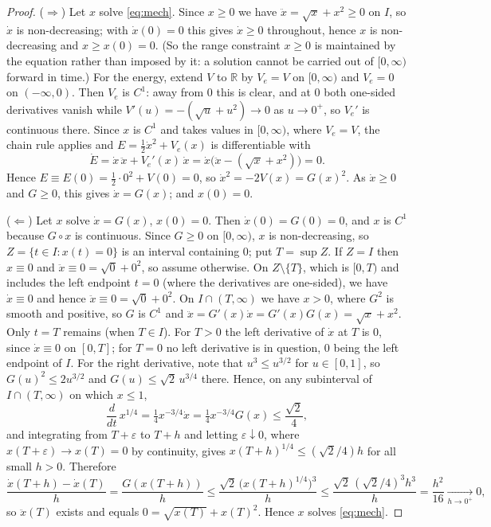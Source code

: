 \documentclass[12pt]{article}
\theoremstyle{plain}
\theoremstyle{definition}
\theoremstyle{remark}
\newcommand{\R}{\mathbb{R}}
\begin{document}
\begin{proof}
($\Rightarrow$) Let $x$ solve \eqref{eq:mech}. Since $x\ge0$ we have
$\ddot x=\sqrt x+x^{2}\ge0$ on $I$, so $\dot x$ is non-decreasing; with
$\dot x(0)=0$ this gives $\dot x\ge0$ throughout, hence $x$ is non-decreasing
and $x\ge x(0)=0$. (So the range constraint $x\ge0$ is maintained by the
equation rather than imposed by it: a solution cannot be carried out of
$[0,\infty)$ forward in time.) For the energy, extend $V$ to $\R$ by
$V_{e}=V$ on $[0,\infty)$ and $V_{e}=0$ on $(-\infty,0)$. Then $V_{e}$ is
$C^{1}$: away from $0$ this is clear, and at $0$ both one-sided derivatives
vanish while $V'(u)=-(\sqrt u+u^{2})\to0$ as $u\to0^{+}$, so $V_{e}'$ is
continuous there. Since $x$ is $C^{1}$ and takes values in $[0,\infty)$, where
$V_{e}=V$, the chain rule applies and
$E=\tfrac12\dot x^{2}+V_{e}(x)$ is differentiable with
\[
  \dot E=\dot x\,\ddot x+V_{e}'(x)\,\dot x
        =\dot x\big(\ddot x-(\sqrt x+x^{2})\big)=0 .
\]
Hence $E\equiv E(0)=\tfrac12\cdot0^{2}+V(0)=0$, so
$\dot x^{2}=-2V(x)=G(x)^{2}$. As $\dot x\ge0$ and $G\ge0$, this gives
$\dot x=G(x)$; and $x(0)=0$.

($\Leftarrow$) Let $x$ solve $\dot x=G(x)$, $x(0)=0$. Then $\dot x(0)=G(0)=0$,
and $x$ is $C^{1}$ because $G\circ x$ is continuous. Since $G\ge0$ on
$[0,\infty)$, $x$ is non-decreasing, so $Z=\{t\in I:x(t)=0\}$ is an interval
containing $0$; put $T=\sup Z$. If $Z=I$ then $x\equiv0$ and
$\ddot x\equiv0=\sqrt0+0^{2}$, so assume otherwise. On $Z\setminus\{T\}$, which is
$[0,T)$ and includes the left endpoint $t=0$ (where the derivatives are
one-sided), we have $\dot x\equiv0$ and hence
$\ddot x\equiv0=\sqrt0+0^{2}$. On
$I\cap(T,\infty)$ we have $x>0$, where $G^{2}$ is smooth and positive, so $G$ is
$C^{1}$ and $\ddot x=G'(x)\dot x=G'(x)G(x)=\sqrt x+x^{2}$. Only $t=T$ remains
(when $T\in I$). For $T>0$ the left derivative of $\dot x$ at $T$ is $0$, since
$\dot x\equiv0$ on $[0,T]$; for $T=0$ no left derivative is in question, $0$
being the left endpoint of $I$. For the right derivative, note that $u^{3}\le u^{3/2}$ for $u\in[0,1]$, so
$G(u)^{2}\le 2u^{3/2}$ and $G(u)\le\sqrt2\,u^{3/4}$ there. Hence, on any
subinterval of $I\cap(T,\infty)$ on which $x\le1$,
\[
  \frac{d}{dt}\,x^{1/4}=\tfrac14 x^{-3/4}\dot x=\tfrac14 x^{-3/4}G(x)
  \le\frac{\sqrt2}{4},
\]
and integrating from $T+\varepsilon$ to $T+h$ and letting $\varepsilon\downarrow0$,
where $x(T+\varepsilon)\to x(T)=0$ by continuity, gives
$x(T+h)^{1/4}\le(\sqrt2/4)h$ for all small $h>0$. Therefore
\[
  \frac{\dot x(T+h)-\dot x(T)}{h}=\frac{G(x(T+h))}{h}
  \le\frac{\sqrt2\,\big(x(T+h)^{1/4}\big)^{3}}{h}
  \le\frac{\sqrt2\,(\sqrt2/4)^{3}h^{3}}{h}=\frac{h^{2}}{16}
  \xrightarrow[h\to0^{+}]{}0 ,
\]
so $\ddot x(T)$ exists and equals $0=\sqrt{x(T)}+x(T)^{2}$. Hence $x$ solves
\eqref{eq:mech}.
\end{proof}
\end{document}
